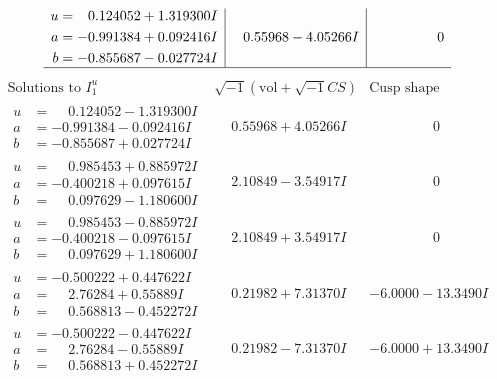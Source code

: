 \documentclass[1p]{elsarticle_modified}
\theoremstyle{definition}
\newcommand{\I}{\sqrt{-1}}
\begin{document}
$$\begin{array}{c|c|c}
\begin{aligned}
u &= \phantom{-}0.124052 + 1.319300 I \\
a &= -0.991384 + 0.092416 I \\
b &= -0.855687 - 0.027724 I\end{aligned}
 & \phantom{-}0.55968 - 4.05266 I & \phantom{-0.000000 } 0\\
 \hline 
 \end{array}$$\newpage$$\begin{array}{c|c|c}  
\text{Solutions to }I^u_{1}& \I (\text{vol} + \sqrt{-1}CS) & \text{Cusp shape}\\
 \hline 
\begin{aligned}
u &= \phantom{-}0.124052 - 1.319300 I \\
a &= -0.991384 - 0.092416 I \\
b &= -0.855687 + 0.027724 I\end{aligned}
 & \phantom{-}0.55968 + 4.05266 I & \phantom{-0.000000 } 0 \\ \hline\begin{aligned}
u &= \phantom{-}0.985453 + 0.885972 I \\
a &= -0.400218 + 0.097615 I \\
b &= \phantom{-}0.097629 - 1.180600 I\end{aligned}
 & \phantom{-}2.10849 - 3.54917 I & \phantom{-0.000000 } 0 \\ \hline\begin{aligned}
u &= \phantom{-}0.985453 - 0.885972 I \\
a &= -0.400218 - 0.097615 I \\
b &= \phantom{-}0.097629 + 1.180600 I\end{aligned}
 & \phantom{-}2.10849 + 3.54917 I & \phantom{-0.000000 } 0 \\ \hline\begin{aligned}
u &= -0.500222 + 0.447622 I \\
a &= \phantom{-}2.76284 + 0.55889 I \\
b &= \phantom{-}0.568813 - 0.452272 I\end{aligned}
 & \phantom{-}0.21982 + 7.31370 I & -6.0000 - 13.3490 I \\ \hline\begin{aligned}
u &= -0.500222 - 0.447622 I \\
a &= \phantom{-}2.76284 - 0.55889 I \\
b &= \phantom{-}0.568813 + 0.452272 I\end{aligned}
 & \phantom{-}0.21982 - 7.31370 I & -6.0000 + 13.3490 I \\ \hline\begin{aligned}

\end{aligned}
\end{array}$$
\end{document}
